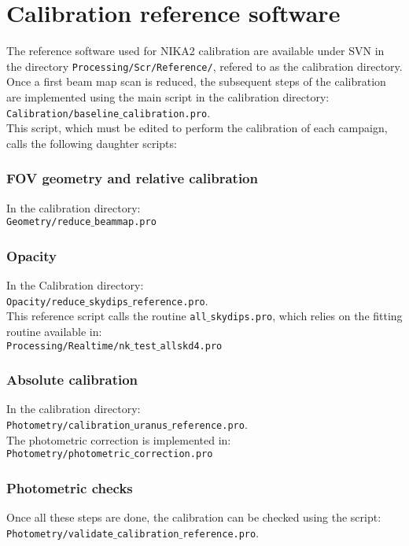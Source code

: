 \section{Calibration reference software}

The reference software used for NIKA2 calibration are available under
SVN in the directory {\tt Processing/Scr/Reference/}, refered to as
the calibration directory. Once a first beam map scan is reduced, the
subsequent steps of the calibration are implemented using the main
script in the calibration directory: \\ 
{\tt Calibration/baseline$\_$calibration.pro}. \\
This script, which must be edited to perform the calibration of each
campaign, calls the following daughter scripts:


\subsubsection*{FOV geometry and relative calibration}
In the calibration directory:  \\
{\tt Geometry/reduce$\_$beammap.pro}

\subsubsection*{Opacity}
In the Calibration directory: \\
{\tt Opacity/reduce$\_$skydips$\_$reference.pro}. \\
This reference script calls the routine {\tt all$\_$skydips.pro}, which relies on
the fitting routine available in: \\
{\tt Processing/Realtime/nk$\_$test$\_$allskd4.pro}

\subsubsection*{Absolute calibration}
In the calibration directory: \\
{\tt Photometry/calibration$\_$uranus$\_$reference.pro}.\\
The photometric correction is implemented in: \\
{\tt Photometry/photometric$\_$correction.pro}


\subsubsection*{Photometric checks}
Once all these steps are done, the calibration can be checked using
the script:\\
{\tt Photometry/validate$\_$calibration$\_$reference.pro}.

